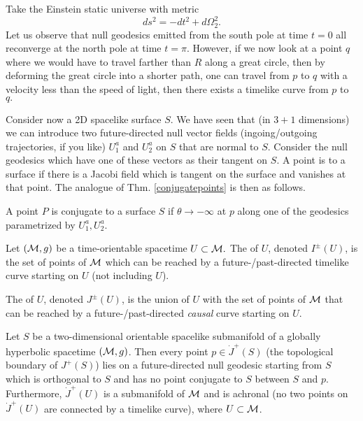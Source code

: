 \begin{exm}
    Take the Einstein static universe with metric 
    \begin{equation*}
        ds^2=-dt^2+d\Omega_2^2.
    \end{equation*}
    Let us observe that null geodesics emitted from the south pole at time $t=0$ all reconverge at the north pole at time $t=\pi$.
    However, if we now look at a point $q$ where we would have to travel farther than $R$ along a great circle, then by deforming the great circle into a shorter path, one can travel from $p$ to $q$ with a velocity less than the speed of light, then there exists a timelike curve from $p$ to $q.$
\end{exm}

Consider now a 2D spacelike surface $S$. We have seen that (in $3+1$ dimensions) we can introduce two future-directed null vector fields (ingoing/outgoing trajectories, if you like) $U^a_1$ and $U^a_2$ on $S$ that are normal to $S$. Consider the null geodesics which have one of these vectors as their tangent on $S$. A point is  to a surface if there is a Jacobi field which is tangent on the surface and vanishes at that point. The analogue of Thm. \ref{conjugatepoints} is then as follows.

\begin{thm}
    A point $P$ is conjugate to a surface $S$ if $\theta \to -\infty$ at $p$ along one of the geodesics parametrized by $U^a_1,U^a_2$.
\end{thm}

\begin{defn}
    Let $(\mathcal{M},g)$ be a time-orientable spacetime $U\subset{ \mathcal{M}}.$ The  of $U$, denoted $I^\pm(U)$, is the set of points of $\mathcal{M}$ which can be reached by a future-/past-directed timelike curve starting on $U$ (not including $U$).
\end{defn}
\begin{defn}
    The  of $U$, denoted $J^\pm(U)$, is the union of $U$ with the set of points of $\mathcal{M}$ that can be reached by a future-/past-directed \emph{causal} curve starting on $U$.
\end{defn}

\begin{thm}
    Let $S$ be a two-dimensional orientable spacelike submanifold of a globally hyperbolic spacetime $(\mathcal{M},g)$. Then every point $p\in \dot J^+(S)$ (the topological boundary of $J^+(S)$) lies on a future-directed null geodesic starting from $S$ which is orthogonal to $S$ and has no point conjugate to $S$ between $S$ and $p$. Furthermore, $\dot J^+(U)$ is a submanifold of $\mathcal{M}$ and is achronal (no two points on $\dot J^+(U)$ are connected by a timelike curve), where $U\subset \mathcal{M}$.
\end{thm}
